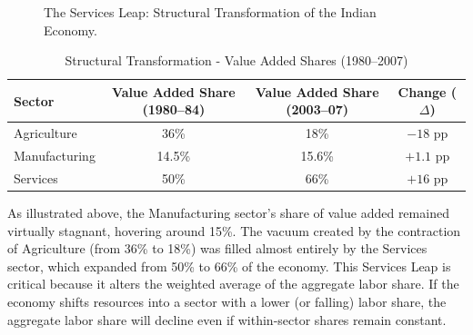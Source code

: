 \documentclass[12pt]{article}
\begin{document}
\begin{figure}[H]
\centering
{}
\caption{The Services Leap: Structural Transformation of the Indian Economy.}
\label{fig:structure}
\end{figure}

\begin{table}[H]
\centering
\caption{Structural Transformation - Value Added Shares (1980--2007)}
\begin{tabular}{lccc}
\toprule
Sector & Value Added Share (1980--84) & Value Added Share (2003--07) & Change ($\Delta$) \\
\midrule
Agriculture & 36\% & 18\% & $-18$ pp \\
Manufacturing & 14.5\% & 15.6\% & $+1.1$ pp \\
Services & 50\% & 66\% & $+16$ pp \\
\bottomrule
\end{tabular}
\end{table}

As illustrated above, the Manufacturing sector's share of value added remained virtually stagnant, hovering around 15\%. The vacuum created by the contraction of Agriculture (from 36\% to 18\%) was filled almost entirely by the Services sector, which expanded from 50\% to 66\% of the economy. This Services Leap is critical because it alters the weighted average of the aggregate labor share. If the economy shifts resources into a sector with a lower (or falling) labor share, the aggregate labor share will decline even if within-sector shares remain constant.
\end{document}
